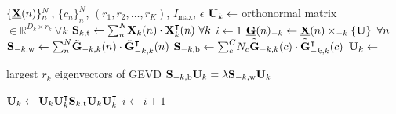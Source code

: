\begin{algorithmic}[1]
  \Require $\{\ten{X}(n)\}_n^N$, $\{c_n\}_n^N$,
  $(r_1,r_2,\ldots,r_K)$, $I_\text{max}$, $\epsilon$
  \State $\mat{U}_k \gets $ orthonormal matrix $\in \mathbb{R}^{D_k\times r_k}
  \ \forall k$
  \State $\mat{S}_{k,\text{t}} \gets
  \textstyle{\sum_n^N}\mat{X}_k(n)\cdot\mat{X}_k^\intercal(n)\ \forall k$
  \State $i\gets 1$
  \Repeat
  \State $\ten{G}(n)_{-k} \gets \ten{X}(n)\mmprs{\mat{U}}{k} \ \forall n$
  \State $\mat{S}_{-k,\text{w}} \gets
  \textstyle{\sum_n^N}\tilde{\mat{G}}_{-k,k}(n)\cdot\tilde{\mat{G}}_{-k,k}^\intercal(n)$
  \State $\mat{S}_{-k,\text{b}} \gets
  \textstyle{\sum_c^C}N_c\tilde{\bar{\mat{G}}}_{-k,k}(c)\cdot\tilde{\bar{\mat{G}}}_{-k,k}^\intercal(c)$
  \State $\mat{U}_k\gets$ \parbox[t]{5cm}{largest $r_k$ eigenvectors of GEVD $\mat{S}_{-k,\text{b}}\mat{U}_k =
    \mat{\lambda}\mat{S}_{-k,\text{w}}\mat{U}_k$}
    \State $\mat{U}_k \gets
  \mat{U}_k\mat{U}_k^\intercal\mat{S}_{k,\text{t}}\mat{U}_k\mat{U}_k^\intercal$
  \EndFor
  \State $i\gets i+1$
\end{algorithmic}
